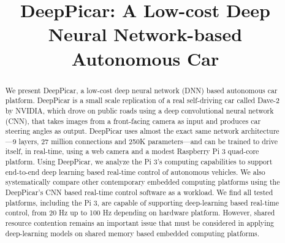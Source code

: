\documentclass[conference]{IEEEtran}
\begin{document}
\title{DeepPicar: A Low-cost Deep Neural Network-based Autonomous Car}
 
\author{
\and
{}
\and
{}
\and
{}
}

\maketitle

\begin{abstract}
We present DeepPicar, a low-cost deep neural network (DNN) based
autonomous car platform. DeepPicar is a small scale
replication of a real self-driving car called Dave-2 by NVIDIA, which
drove on public roads using a deep convolutional neural network (CNN), 
that takes images from a front-facing camera as input and produces
car steering angles as output. DeepPicar uses almost the exact same 
network architecture---9 layers, 27 million connections and 250K
parameters---and can be trained to drive itself, in real-time, using a
web camera and a modest Raspberry Pi 3 quad-core platform.
Using DeepPicar, we analyze the Pi 3's computing capabilities to 
support end-to-end deep learning based real-time control of autonomous
vehicles. We also systematically compare other contemporary embedded
computing platforms using the DeepPicar's CNN based real-time control
software as a workload. 
We find all tested platforms, including the Pi 3, are capable of
supporting deep-learning based real-time control, from 20 Hz up to 100
Hz depending on hardware platform. 
However, shared resource contention remains an
important issue that must be considered in applying deep-learning
models on shared memory based embedded computing platforms.
\end{abstract}
\end{document}
